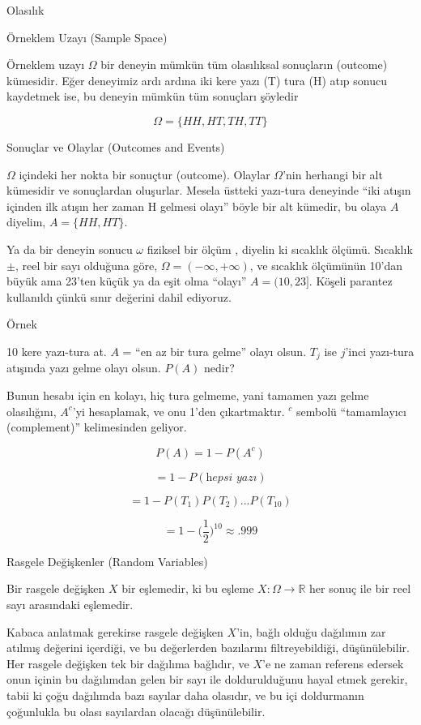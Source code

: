 \documentclass[12pt,fleqn]{article}\usepackage{../../common}
\begin{document}
Olasılık

Örneklem Uzayı (Sample Space)

Örneklem uzayı $\Omega$ bir deneyin mümkün tüm olasılıksal sonuçların
(outcome) kümesidir. Eğer deneyimiz ardı ardına iki kere yazı (T) tura (H)
atıp sonucu kaydetmek ise, bu deneyin mümkün tüm sonuçları şöyledir

$$\Omega = \{HH,HT,TH,TT\} $$

Sonuçlar ve Olaylar (Outcomes and Events)

$\Omega$ içindeki her nokta bir sonuçtur (outcome). Olaylar $\Omega$'nin
herhangi bir alt kümesidir ve sonuçlardan oluşurlar. Mesela üstteki
yazı-tura deneyinde ``iki atışın içinden ilk atışın her zaman H gelmesi
olayı'' böyle bir alt kümedir, bu olaya $A$ diyelim, $A =
\{HH,HT\}$.

Ya da bir deneyin sonucu $\omega$ fiziksel bir ölçüm , diyelin ki sıcaklık
ölçümü. Sıcaklık $\pm$, reel bir sayı olduğuna göre, $\Omega = (-\infty,
+\infty)$, ve sıcaklık ölçümünün 10'dan büyük ama 23'ten küçük ya da eşit
olma ``olayı'' $A = (10,23]$. Köşeli parantez kullanıldı çünkü sınır
değerini dahil ediyoruz. 

Örnek 

10 kere yazı-tura at. $A$ = ``en az bir tura gelme'' olayı olsun. $T_j$ ise
$j$'inci yazı-tura atışında yazı gelme olayı olsun. $P(A)$ nedir? 

Bunun hesabı için en kolayı, hiç tura gelmeme, yani tamamen yazı gelme
olasılığını, $A^c$'yi hesaplamak, ve onu 1'den çıkartmaktır. $^c$ sembolü
``tamamlayıcı (complement)'' kelimesinden geliyor.

$$ P(A) = 1 - P(A^c) $$

$$ = 1 - P(\textit{hepsi yazı}) $$

$$ = 1-P(T_1)P(T_2)...P(T_{10}) $$

$$ = 1 - \bigg(\frac{1}{2}\bigg)^{10} \approx .999 $$

Rasgele Değişkenler (Random Variables)

Bir rasgele değişken $X$ bir eşlemedir, ki bu eşleme $X: \Omega \to
\mathbb{R}$ her sonuç ile bir reel sayı arasındaki eşlemedir.

Kabaca anlatmak gerekirse rasgele değişken $X$'in, bağlı olduğu dağılımın
zar atılmış değerini içerdiği, ve bu değerlerden bazılarını
filtreyebildiği, düşünülebilir. Her rasgele değişken tek bir dağılıma
bağlıdır, ve $X$'e ne zaman referens edersek onun içinin bu dağılımdan
gelen bir sayı ile doldurulduğunu hayal etmek gerekir, tabii ki çoğu
dağılımda bazı sayılar daha olasıdır, ve bu içi doldurmanın çoğunlukla bu
olası sayılardan olacağı düşünülebilir.
\end{document}
